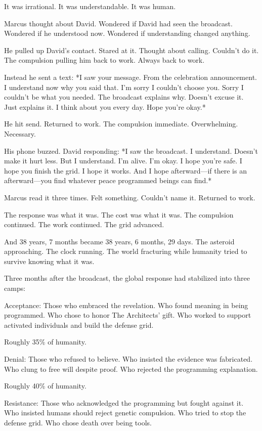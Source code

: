 It was irrational. It was understandable. It was human.

Marcus thought about David. Wondered if David had seen the broadcast. Wondered if he understood now. Wondered if understanding changed anything.

He pulled up David's contact. Stared at it. Thought about calling. Couldn't do it. The compulsion pulling him back to work. Always back to work.

Instead he sent a text: *I saw your message. From the celebration announcement. I understand now why you said that. I'm sorry I couldn't choose you. Sorry I couldn't be what you needed. The broadcast explains why. Doesn't excuse it. Just explains it. I think about you every day. Hope you're okay.*

He hit send. Returned to work. The compulsion immediate. Overwhelming. Necessary.

His phone buzzed. David responding: *I saw the broadcast. I understand. Doesn't make it hurt less. But I understand. I'm alive. I'm okay. I hope you're safe. I hope you finish the grid. I hope it works. And I hope afterward—if there is an afterward—you find whatever peace programmed beings can find.*

Marcus read it three times. Felt something. Couldn't name it. Returned to work.

The response was what it was. The cost was what it was. The compulsion continued. The work continued. The grid advanced.

And 38 years, 7 months became 38 years, 6 months, 29 days. The asteroid approaching. The clock running. The world fracturing while humanity tried to survive knowing what it was.

\scenebreak

Three months after the broadcast, the global response had stabilized into three camps:

Acceptance: Those who embraced the revelation. Who found meaning in being programmed. Who chose to honor The Architects' gift. Who worked to support activated individuals and build the defense grid.

Roughly 35\% of humanity.

Denial: Those who refused to believe. Who insisted the evidence was fabricated. Who clung to free will despite proof. Who rejected the programming explanation.

Roughly 40\% of humanity.

Resistance: Those who acknowledged the programming but fought against it. Who insisted humans should reject genetic compulsion. Who tried to stop the defense grid. Who chose death over being tools.

